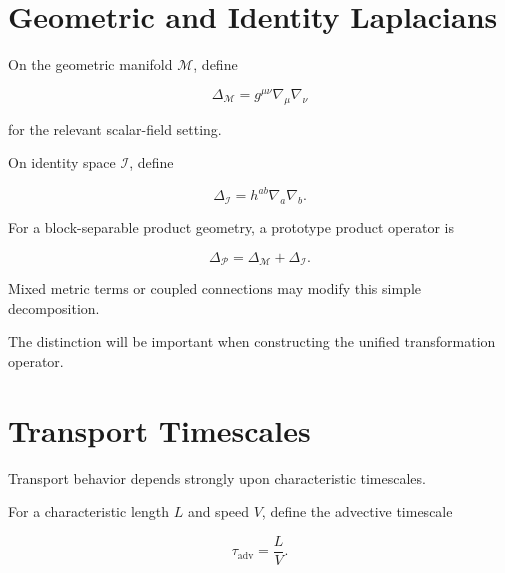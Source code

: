 \documentclass[12pt,oneside]{book}
\begin{document}
\section{Geometric and Identity Laplacians}
\label{sec:geometric-identity-laplacians}

On the geometric manifold \(\mathcal{M}\), define

\begin{equation}
    \Delta_{\mathcal{M}}
    =
    g^{\mu\nu}
    \nabla_\mu\nabla_\nu
    \label{eq:spacetime-laplacian}
\end{equation}

for the relevant scalar-field setting.

On identity space \(\mathcal{I}\), define

\begin{equation}
    \Delta_{\mathcal{I}}
    =
    h^{ab}
    \nabla_a\nabla_b.
    \label{eq:identity-laplacian}
\end{equation}

For a block-separable product geometry, a prototype product
operator is

\begin{equation}
    \Delta_{\mathcal{P}}
    =
    \Delta_{\mathcal{M}}
    +
    \Delta_{\mathcal{I}}.
    \label{eq:product-laplacian}
\end{equation}

Mixed metric terms or coupled connections may modify this
simple decomposition.

The distinction will be important when constructing the unified
transformation operator.


\section{Transport Timescales}
\label{sec:transport-timescales}

Transport behavior depends strongly upon characteristic
timescales.

For a characteristic length \(L\) and speed \(V\), define the
advective timescale

\begin{equation}
    \tau_{\mathrm{adv}}
    =
    \frac{L}{V}.
    \label{eq:advective-timescale}
\end{equation}
\end{document}
